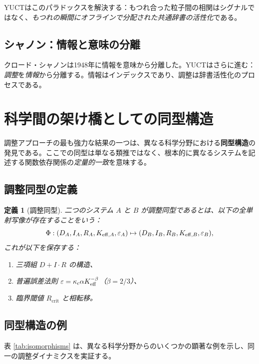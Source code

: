 \documentclass[11pt,a4paper]{article}
\newtheorem{definition}{定義}[section]
\newcommand{\kappac}{\kappa_c}
\newcommand{\eps}{\varepsilon}
\newcommand{\betaf}{\beta}
\newcommand{\Rcrit}{R_{\mathrm{crit}}}
\begin{document}
	YUCTはこのパラドックスを解決する：もつれ合った粒子間の相関はシグナルではなく、\emph{もつれの瞬間にオフラインで分配された共通辞書の活性化}である。
	
	\subsection{シャノン：情報と意味の分離}
	
	クロード・シャノンは1948年に情報を意味から分離した。YUCTはさらに進む：\emph{調整}を\emph{情報}から分離する。情報はインデックスであり、調整は辞書活性化のプロセスである。
	
	\section{科学間の架け橋としての同型構造}
	\label{sec:isomorphisms}
	
	調整アプローチの最も強力な結果の一つは、異なる科学分野における\textbf{同型構造}の発見である。ここでの同型は単なる類推ではなく、根本的に異なるシステムを記述する関数依存関係の\emph{定量的一致}を意味する。
	
	\subsection{調整同型の定義}
	
	\begin{definition}[調整同型]
		二つのシステム \(A\) と \(B\) が調整同型であるとは、以下の全単射写像が存在することをいう：
		\[
		\Phi: (D_A, I_A, R_A, \Keff[A], \eps_A) \mapsto (D_B, I_B, R_B, \Keff[B], \eps_B),
		\]
		これが以下を保存する：
		\begin{enumerate}
			\item 三項組 \(D+I\cdot R\) の構造、
			\item 普遍誤差法則 \(\eps = \kappac \alpha \Keff^{-\betaf}\)（\(\betaf = 2/3\)）、
			\item 臨界閾値 \(\Rcrit\) と相転移。
		\end{enumerate}
	\end{definition}
	
	\subsection{同型構造の例}
	
	表 \ref{tab:isomorphisms} は、異なる科学分野からのいくつかの顕著な例を示し、同一の調整ダイナミクスを実証する。
	
\end{document}
